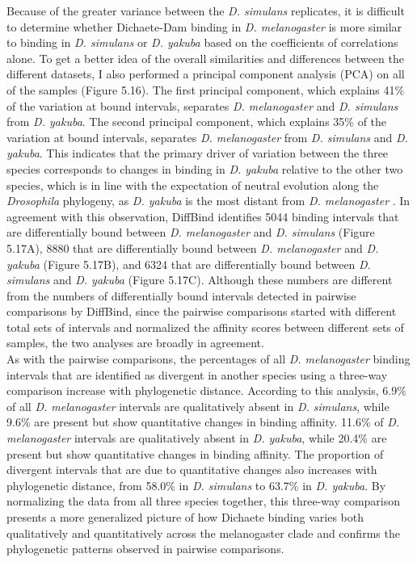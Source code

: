 Because of the greater variance between the \emph{D. simulans} replicates, it is difficult to determine whether Dichaete-Dam binding in \emph{D. melanogaster} is more similar to binding in \emph{D. simulans} or \emph{D. yakuba} based on the coefficients of correlations alone. To get a better idea of the overall similarities and differences between the different datasets, I also performed a principal component analysis (PCA) on all of the samples (Figure 5.16). The first principal component, which explains 41\% of the variation at bound intervals, separates \emph{D. melanogaster} and \emph{D. simulans} from \emph{D. yakuba}. The second principal component, which explains 35\% of the variation at bound intervals, separates \emph{D. melanogaster} from \emph{D. simulans} and \emph{D. yakuba}. This indicates that the primary driver of variation between the three species corresponds to changes in binding in \emph{D. yakuba} relative to the other two species, which is in line with the expectation of neutral evolution along the \emph{Drosophila} phylogeny, as \emph{D. yakuba} is the most distant from \emph{D. melanogaster} \citep{russo_molecular_1995}. In agreement with this observation, DiffBind identifies 5044 binding intervals that are differentially bound between \emph{D. melanogaster} and \emph{D. simulans} (Figure 5.17A), 8880 that are differentially bound between \emph{D. melanogaster} and \emph{D. yakuba} (Figure 5.17B), and 6324 that are differentially bound between \emph{D. simulans} and \emph{D. yakuba} (Figure 5.17C). Although these numbers are different from the numbers of differentially bound intervals detected in pairwise comparisons by DiffBind, since the pairwise comparisons started with different total sets of intervals and normalized the affinity scores between different sets of samples, the two analyses are broadly in agreement.\\

As with the pairwise comparisons, the percentages of all \emph{D. melanogaster} binding intervals that are identified as divergent in another species using a three-way comparison increase with phylogenetic distance. According to this analysis, 6.9\% of all \emph{D. melanogaster} intervals are qualitatively absent in \emph{D. simulans}, while 9.6\% are present but show quantitative changes in binding affinity. 11.6\% of \emph{D. melanogaster} intervals are qualitatively absent in \emph{D. yakuba}, while 20.4\% are present but show quantitative changes in binding affinity. The proportion of divergent intervals that are due to quantitative changes also increases with phylogenetic distance, from 58.0\% in \emph{D. simulans} to 63.7\% in \emph{D. yakuba}. By normalizing the data from all three species together, this three-way comparison presents a more generalized picture of how Dichaete binding varies both qualitatively and quantitatively across the melanogaster clade and confirms the phylogenetic patterns observed in pairwise comparisons.

